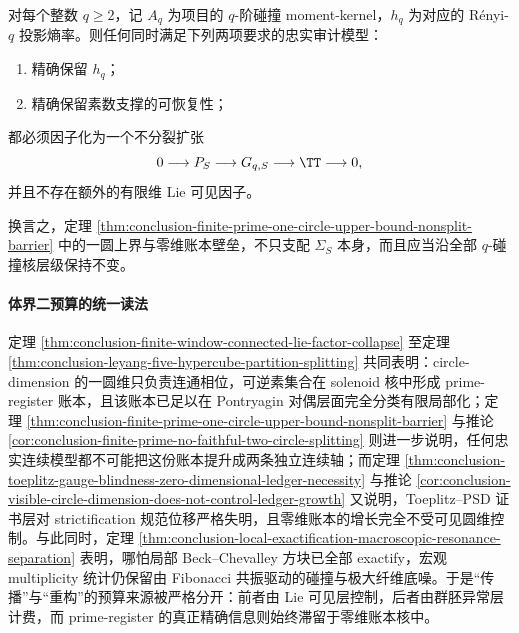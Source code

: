 \begin{conjecture}\label{conj:conclusion-qcollision-one-circle-zero-dimensional-ledger-barrier}
对每个整数 \(q\ge 2\)，记 \(A_q\) 为项目的 \(q\)-阶碰撞 moment-kernel，\(h_q\) 为对应的 Rényi-\(q\) 投影熵率。则任何同时满足下列两项要求的忠实审计模型：
\begin{enumerate}
  \item 精确保留 \(h_q\)；
  \item 精确保留素数支撑的可恢复性；
\end{enumerate}
都必须因子化为一个不分裂扩张
\[
0\longrightarrow P_S\longrightarrow G_{q,S}\longrightarrow \TT\longrightarrow 0,
\]
并且不存在额外的有限维 Lie 可见因子。

换言之，定理 \ref{thm:conclusion-finite-prime-one-circle-upper-bound-nonsplit-barrier} 中的一圆上界与零维账本壁垒，不只支配 \(\Sigma_S\) 本身，而且应当沿全部 \(q\)-碰撞核层级保持不变。
\end{conjecture}



\paragraph{体界二预算的统一读法}
定理 \ref{thm:conclusion-finite-window-connected-lie-factor-collapse} 至定理 \ref{thm:conclusion-leyang-five-hypercube-partition-splitting} 共同表明：circle-dimension 的一圆维只负责连通相位，可逆素集合在 solenoid 核中形成 prime-register 账本，且该账本已足以在 Pontryagin 对偶层面完全分类有限局部化；定理 \ref{thm:conclusion-finite-prime-one-circle-upper-bound-nonsplit-barrier} 与推论 \ref{cor:conclusion-finite-prime-no-faithful-two-circle-splitting} 则进一步说明，任何忠实连续模型都不可能把这份账本提升成两条独立连续轴；而定理 \ref{thm:conclusion-toeplitz-gauge-blindness-zero-dimensional-ledger-necessity} 与推论 \ref{cor:conclusion-visible-circle-dimension-does-not-control-ledger-growth} 又说明，Toeplitz--PSD 证书层对 strictification 规范位移严格失明，且零维账本的增长完全不受可见圆维控制。与此同时，定理 \ref{thm:conclusion-local-exactification-macroscopic-resonance-separation} 表明，哪怕局部 Beck--Chevalley 方块已全部 exactify，宏观 multiplicity 统计仍保留由 Fibonacci 共振驱动的碰撞与极大纤维底噪。于是“传播”与“重构”的预算来源被严格分开：前者由 Lie 可见层控制，后者由群胚异常层计费，而 prime-register 的真正精确信息则始终滞留于零维账本核中。

\endinput
